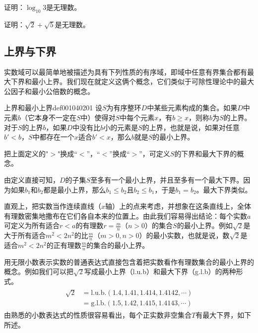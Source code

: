 \begin{problem}
证明：$\log_{10}{3}$是无理数。
\end{problem}

\begin{problem}
证明：$\sqrt{2} + \sqrt{5}$是无理数。
\end{problem}



\subsection{上界与下界}\label{subsection0010402}
实数域可以最简单地被描述为具有下列性质的有序域，即域中任意有界集合都有最大下界和最小上界。我们现在就定义这俩个概念，它们类似于可除性理论中的最大公因子和最小公倍数的概念。

\begin{definition}{上界和最小上界}{def001040201}
设$S$为有序整环$D$中某些元素构成的集合。如果$D$中元素$b$（它本身不一定在$S$中）使得对$S$中每个元素$x$，有$b \ge x$，则称$b$为$S$的上界。对于$S$的上界$b$，如果$D$中没有比$b$小的元素是$S$的上界，也就是说，如果对任意$b' < b$，$S$中都存在一个$x$适合$b'<x$，那么$b$就是$S$的最小上界。
\end{definition}

把上面定义的"$>$"换成“$<$”，“$<$”换成“$>$”，可定义$S$的下界和最大下界的概念。

由定义直接可知，$D$的子集$S$至多有一个最小上界，并且至多有一个最大下界。因为如果$b_1$和$b_2$都是最小上界，那么$b_1 \le b_2$且$b_2 \le b_1$，于是$b_1=b_2$。最大下界类似。

直观上，把实数当作连续直线（$x$轴）上的点来考虑，并想象在这条直线上，全体有理数密集地撒布在它们各自本来的位置上。由此我们容易得出结论：每个实数$a$可定义为所有适合$r < a$的有理数$r = \frac{m}{n}$（$n > 0$）的集合$S$的最小上界。例如$\sqrt{2}$是大于所有适合$m^2 < 2n^2$的比$\frac{m}{n}$（$m > 0, n > 0$）的最小实数，也就是说，数$\sqrt{2}$是适合$m^2<2n^2$的正有理数$\frac{m}{n}$的集合的最小上界。

用无限小数表示实数的普通表达式直接包含着把实数看作有理数集合的最小上界的概念。例如我们可以把$\sqrt{2}$写成最小上界（l.u.b）和最大下界（g.l.b）的两种形式。
\begin{gather}\label{equ001040204}
\begin{aligned}
\sqrt{2} &= \text{l.u.b.}(1.4,1.41,1.414,1.4142,\cdots)\\
&=\text{g.l.b.}(1.5, 1.42, 1.415, 1.4143,\cdots)
\end{aligned}
\end{gather}
由熟悉的小数表达式的性质很容易看出，每个正实数非空集合$T$有最大下界，如下所述。


